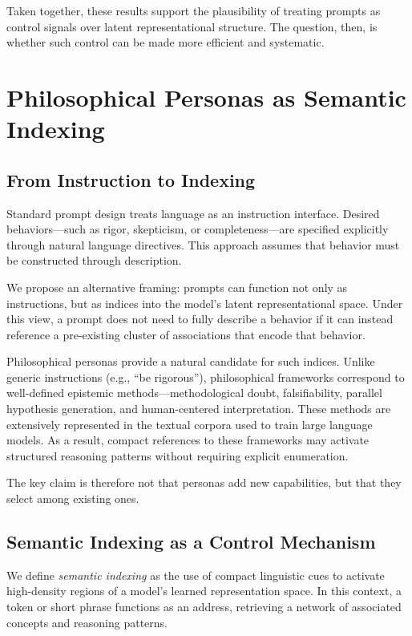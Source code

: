 \documentclass[11pt]{article}
\begin{document}
Taken together, these results support the plausibility of treating prompts as control signals over latent representational structure. The question, then, is whether such control can be made more efficient and systematic.

\section{Philosophical Personas as Semantic Indexing}

\subsection{From Instruction to Indexing}

Standard prompt design treats language as an instruction interface. Desired behaviors—such as rigor, skepticism, or completeness—are specified explicitly through natural language directives. This approach assumes that behavior must be constructed through description.

We propose an alternative framing: prompts can function not only as instructions, but as indices into the model’s latent representational space. Under this view, a prompt does not need to fully describe a behavior if it can instead reference a pre-existing cluster of associations that encode that behavior.

Philosophical personas provide a natural candidate for such indices. Unlike generic instructions (e.g., “be rigorous”), philosophical frameworks correspond to well-defined epistemic methods—methodological doubt, falsifiability, parallel hypothesis generation, and human-centered interpretation. These methods are extensively represented in the textual corpora used to train large language models. As a result, compact references to these frameworks may activate structured reasoning patterns without requiring explicit enumeration.

The key claim is therefore not that personas add new capabilities, but that they select among existing ones.

\subsection{Semantic Indexing as a Control Mechanism}

We define \emph{semantic indexing} as the use of compact linguistic cues to activate high-density regions of a model’s learned representation space. In this context, a token or short phrase functions as an address, retrieving a network of associated concepts and reasoning patterns.
\end{document}
